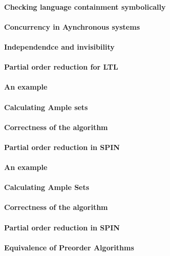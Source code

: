 \paragraph{Checking language containment symbolically}
\paragraph{Concurrency in Aynchronous systems}
\paragraph{Independendce and invisibility}
\paragraph{Partial order reduction for LTL}
\paragraph{An example}
\paragraph{Calculating Ample sets}
\paragraph{Correctness of the algorithm}
\paragraph{Partial order reduction in SPIN}
\paragraph{An example}
\paragraph{Calculating Ample Sets}
\paragraph{Correctness of the algorithm}
\paragraph{Partial order reduction in SPIN}
\paragraph{Equivalence of Preorder Algorithms}
